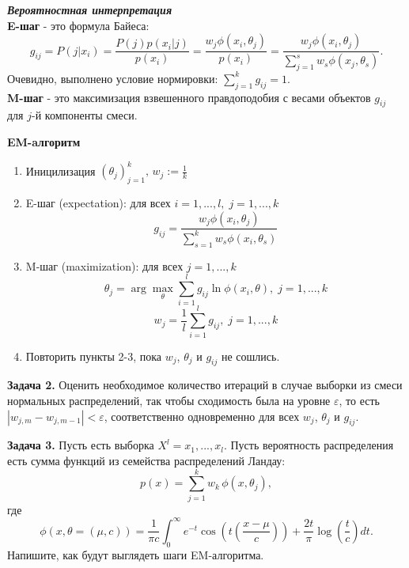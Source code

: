 \textbf{\textit{Вероятностная интерпретация}}
\\
\textbf{E-шаг} - это формула Байеса:
$$g_{ij} = P(j|x_i) = \frac{P(j)p(x_i|j)}{p(x_i)} = \frac{w_j \phi(x_i, \theta_j)}{p(x_i)} = \frac{w_j \phi(x_i,\theta_j)}{\sum_{j=1}^s w_s \phi(x_j, \theta_s)}.$$
Очевидно, выполнено условие нормировки: $\sum_{j=1}^k g_{ij} = 1.$
\\
\textbf{M-шаг} - это максимизация взвешенного правдоподобия с весами объектов $g_{ij}$ для $j$-й компоненты смеси.


\textbf{EM-aлгоритм}
\begin{enumerate}
    \item Иницилизация $(\theta_j)_{j=1}^k, \, w_j:=\frac{1}{k}$
    \item E-шаг (expectation): для всех $i=1,...,l, \; j = 1,...,k$
    $$g_{ij} = \frac{w_j \phi(x_i,\theta_j)}{\sum_{s=1}^k w_s \phi(x_i, \theta_s)}$$
    \item M-шаг (maximization): для всех $j=1,...,k$
    $$\theta_j = \arg \max_\theta \sum_{i=1}^l g_{ij} \ln \phi(x_i, \theta), \; j=1,...,k $$
$$w_j = \frac{1}{l} \sum_{i=1}^l g_{ij}, \; j=1,...,k$$
    \item Повторить пункты 2-3, пока $w_j$, $\theta_j$ и $g_{ij}$ не сошлись.
    
\end{enumerate}

\textbf{Задача 2.} Оценить необходимое количество итераций в случае выборки из смеси нормальных распределений, так чтобы сходимость была на уровне $\varepsilon$, то есть $|w_{j,m} - w_{j,m-1}|<\varepsilon$, соответственно одновременно для всех $w_j$, $\theta_j$ и $g_{ij}$.

\textbf{Задача 3.} Пусть есть выборка $X^l = {x_1,...,x_l}$. Пусть вероятность распределения есть сумма функций из семейства распределений Ландау:
$$p(x) = \sum_{j=1}^k w_k \, \phi(x,\theta_j),$$
где $$\phi(x,\theta = (\mu,c)) = \frac{1}{\pi c} \int_0^\infty e^{-t} \cos \left(t \left(\frac{x-\mu}{c}\right)\right) +\frac{2t}{\pi} \log\left(\frac{t}{c}\right) dt.$$
Напишите, как будут выглядеть шаги EM-алгоритма.
 
